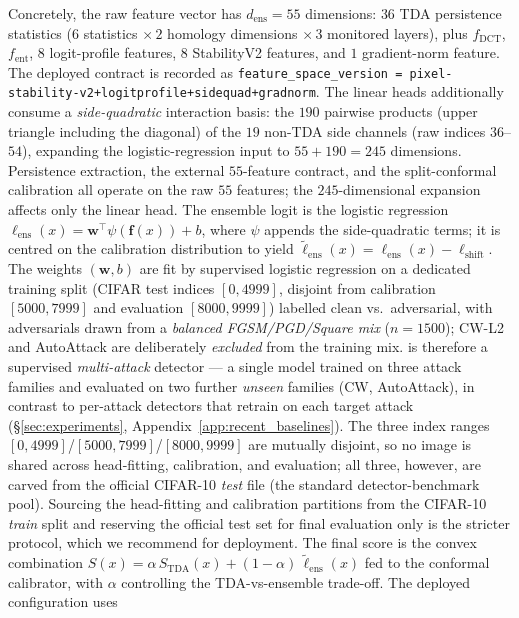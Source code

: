 Concretely, the raw feature vector has $d_\text{ens}=55$ dimensions:
$36$ TDA persistence statistics ($6$ statistics $\times\,2$ homology
dimensions $\times\,3$ monitored layers), plus $f_\mathrm{DCT}$,
$f_\mathrm{ent}$, $8$ logit-profile features, $8$ StabilityV2 features,
and $1$ gradient-norm feature. The deployed contract is recorded as
\texttt{feature\_space\_version =
pixel-stability-v2+logitprofile+sidequad+gradnorm}. The linear heads
additionally consume a \emph{side-quadratic} interaction basis: the
$190$ pairwise products (upper triangle including the diagonal) of the
$19$ non-TDA side channels (raw indices $36$--$54$), expanding the
logistic-regression input to $55+190=245$ dimensions. Persistence
extraction, the external $55$-feature contract, and the split-conformal
calibration all operate on the raw $55$ features; the $245$-dimensional
expansion affects only the linear head.
The ensemble logit is the logistic regression
$\ell_\mathrm{ens}(x) = \mathbf{w}^\top \psi(\mathbf{f}(x)) + b$, where
$\psi$ appends the side-quadratic terms; it is centred on
the calibration distribution to yield
$\tilde\ell_\mathrm{ens}(x) = \ell_\mathrm{ens}(x) - \ell_\mathrm{shift}$.
The weights $(\mathbf{w}, b)$ are fit by supervised logistic regression on a
dedicated training split (CIFAR test indices $[0,4999]$, disjoint from
calibration $[5000,7999]$ and evaluation $[8000,9999]$) labelled clean vs.\
adversarial, with adversarials drawn from a \emph{balanced FGSM/PGD/Square mix}
($n{=}1500$); CW-L2 and AutoAttack are deliberately \emph{excluded} from the
training mix. \prism is therefore a supervised \emph{multi-attack} detector ---
a single model trained on three attack families and evaluated on two further
\emph{unseen} families (CW, AutoAttack), in contrast to per-attack detectors
that retrain on each target attack (\S\ref{sec:experiments},
Appendix~\ref{app:recent_baselines}).
The three index ranges $[0,4999]$/$[5000,7999]$/$[8000,9999]$ are mutually
disjoint, so no image is shared across head-fitting, calibration, and
evaluation; all three, however, are carved from the official CIFAR-10
\emph{test} file (the standard detector-benchmark pool). Sourcing the
head-fitting and calibration partitions from the CIFAR-10 \emph{train}
split and reserving the official test set for final evaluation only is the
stricter protocol, which we recommend for deployment.
The final \prism score is the convex combination
$S(x) = \alpha\, S_\mathrm{TDA}(x) + (1 - \alpha)\, \tilde\ell_\mathrm{ens}(x)$
fed to the \cadg conformal calibrator, with $\alpha$ controlling the
TDA-vs-ensemble trade-off. The deployed configuration uses

